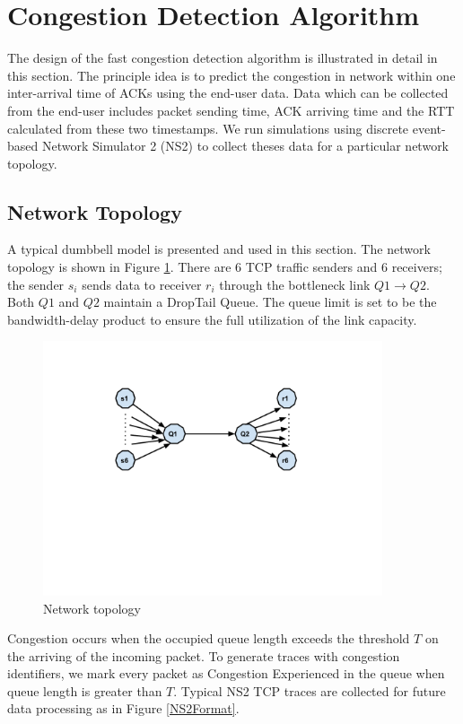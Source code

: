 \section{Congestion Detection Algorithm}
\label{Design}
The design of the fast congestion detection algorithm is illustrated in detail in this section. The principle idea is to predict the congestion in network within one inter-arrival time of ACKs using the end-user data. Data which can be collected from the end-user includes packet sending time, ACK arriving time and the RTT calculated from these two timestamps. We run simulations using discrete event-based Network Simulator 2 (NS2) \cite{NS2} to collect theses data for a particular network topology. 
\subsection{Network Topology}
A typical dumbbell model is presented and used in this section. The network topology is shown in Figure \ref{layout}. There are $6$ TCP traffic senders and $6$ receivers; the sender $s_{i}$ sends data to receiver $r_{i}$ through the bottleneck link $Q1\to Q2$. Both $Q1$ and $Q2$ maintain a DropTail Queue. The queue limit is set to be the bandwidth-delay product to ensure the full utilization of the link capacity.

\begin{figure}
\centering
\includegraphics[width=10cm]{6layout.pdf}
\caption{Network topology}
\label{layout}
\end{figure}
Congestion occurs when the occupied queue length exceeds the threshold $T$ on the arriving of the incoming packet. To generate traces with congestion identifiers, we mark every packet as Congestion Experienced in the queue when queue length is greater than $T$. Typical NS2 TCP traces  \cite{TraceFormat} are collected for future data processing as in Figure \ref{NS2Format}. 

